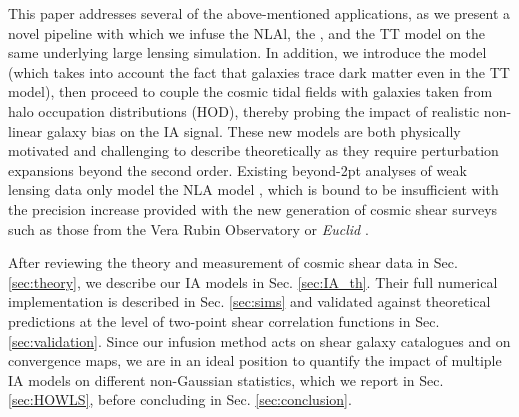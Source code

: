 This paper addresses several of the above-mentioned applications, as we present a novel  pipeline with which we infuse the NLAl, the \dNLA, and the TT model on the same underlying large lensing simulation. 
In addition, we introduce the \dTT model (which takes into account the fact that galaxies trace dark matter even in the TT model), then proceed to couple the cosmic tidal fields with galaxies taken from halo occupation distributions (HOD), thereby probing the impact of realistic non-linear galaxy bias on the IA signal. These new models are both physically motivated and challenging to describe theoretically as they require perturbation expansions beyond the second order.  Existing  beyond-2pt analyses of weak lensing data only model the NLA model \citep{DESY3_Zuercher, HD21}, which is bound to be insufficient with the precision increase provided with the new generation of cosmic shear surveys such as those from the Vera Rubin Observatory \citep{LSST-Design} or {\it Euclid} \citep{RedBook}. 

After reviewing the theory and measurement of cosmic shear data in Sec. \ref{sec:theory}, we describe our IA models in Sec. \ref{sec:IA_th}.  
Their full numerical implementation is described in Sec. \ref{sec:sims} and validated against theoretical predictions at the level of  two-point shear correlation functions in Sec. \ref{sec:validation}.
Since our infusion method acts on shear galaxy catalogues and on convergence maps, we are in an ideal position to quantify the impact of multiple IA models on different non-Gaussian statistics, which we report in Sec. \ref{sec:HOWLS}, before concluding in Sec. \ref{sec:conclusion}. 